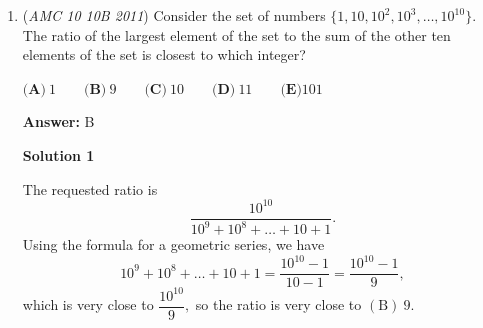 \begin{enumerate}
 Thus $BD = 4 \times \frac{\sqrt{3}}{3}$ and the answer is $BD = \boxed{\textbf{(D)} \frac{4\sqrt{3}}{3}}$




\textbf{Solution 3 (Shortcut)}

The ratio of the areas of $\triangle$$EBD$ and $\triangle$$ABC$ is $1 : 3$, meaning the ratio of the sides is $1 : \sqrt{3}$. The only answer choice involving $\sqrt{3}$ is $\boxed{\textbf{(D) } \frac{4\sqrt{3}}{3}}$.

 -Solution by Joeya

 


 



\textbf{Solution 4 (slightly more vigorous than Solution 3)}

The ratio of the areas is equal to twice the ratio of sides (in similar figures) because area is a second-degree property of similar figures. So like solution 3, the ratio of sides is $\sqrt{\frac{1}{3}}=\frac{1}{\sqrt{3}}=\sqrt{3}.$ By similarity, $\frac{ED}{DB}=\frac{\sqrt{3}}{DB}=\frac{3}{4}$, so solving for DB, we get $\boxed{\textbf{(D) } \frac{4\sqrt{3}}{3}}$.

 



\textbf{Solution 5}

It is apparent that $\Delta ABC \sim \Delta EBD$ by AA similarity ($\angle B=\angle B$ and $\angle EDB=\angle ACB$). Thus, let the side length of $ED$ equal $3x$ and $DB=4x.$ We can then see that $[EDB]=\dfrac{3x\cdot4x}2=6x^2$, and we are given that $[ABC]=3\cdot[EDB]$. Thus, $\dfrac{3\cdot4}2=3\cdot6x^2\implies6=18x^2\implies x=\dfrac{\sqrt{3}}3$. Since we let $BD=4x$, we know that $BD=\boxed{\textbf{(D) }\dfrac{4\sqrt{3}}3}$. ~Technodoggo

 


	\item (\textit{AMC 10 10B 2011}) Consider the set of numbers $\{1, 10, 10^2, 10^3, \ldots, 10^{10}\}$. The ratio of the largest element of the set to the sum of the other ten elements of the set is closest to which integer?


 $\textbf{(A)}\ 1 \qquad\textbf{(B)}\ 9 \qquad\textbf{(C)}\ 10 \qquad\textbf{(D)}\ 11 \qquad\textbf{(E)} 101$

 \textbf{Answer: }B



\textbf{Solution 1}

The requested ratio is 
 \[\dfrac{10^{10}}{10^9 + 10^8 + \ldots + 10 + 1}.\] Using the formula for a geometric series, we have 
 \[10^9 + 10^8 + \ldots + 10 + 1 = \dfrac{10^{10} - 1}{10 - 1} = \dfrac{10^{10} - 1}{9},\] which is very close to $\dfrac{10^{10}}{9},$ so the ratio is very close to $\boxed{\mathrm{(B) \ } 9}.$





\end{enumerate}
